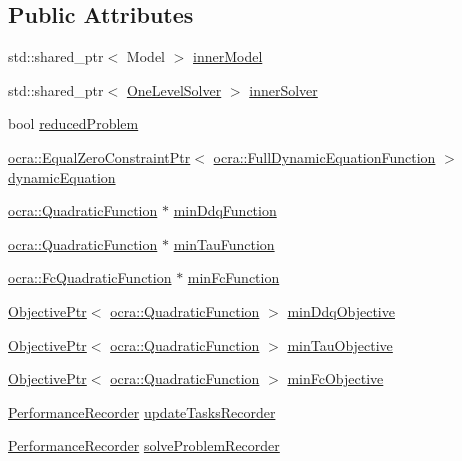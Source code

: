 \subsection*{Public Attributes}
\begin{DoxyCompactItemize}
\item 
std\+::shared\+\_\+ptr$<$ Model $>$ \hyperlink{structwocra_1_1WocraController_1_1Pimpl_a4fe5b4fd5e927bbf9c83bf10ffafc98f}{inner\+Model}
\item 
std\+::shared\+\_\+ptr$<$ \hyperlink{classocra_1_1OneLevelSolver}{One\+Level\+Solver} $>$ \hyperlink{structwocra_1_1WocraController_1_1Pimpl_a761307f74ee3b130993d589372164b98}{inner\+Solver}
\item 
bool \hyperlink{structwocra_1_1WocraController_1_1Pimpl_a809b85a6059fda8abddf709a92224443}{reduced\+Problem}
\item 
\hyperlink{classocra_1_1EqualZeroConstraintPtr}{ocra\+::\+Equal\+Zero\+Constraint\+Ptr}$<$ \hyperlink{classocra_1_1FullDynamicEquationFunction}{ocra\+::\+Full\+Dynamic\+Equation\+Function} $>$ \hyperlink{structwocra_1_1WocraController_1_1Pimpl_a1109652d5d4a11542cc5130713977b73}{dynamic\+Equation}
\item 
\hyperlink{classocra_1_1QuadraticFunction}{ocra\+::\+Quadratic\+Function} $\ast$ \hyperlink{structwocra_1_1WocraController_1_1Pimpl_aac1952b2ca7547f82d807089baa98f10}{min\+Ddq\+Function}
\item 
\hyperlink{classocra_1_1QuadraticFunction}{ocra\+::\+Quadratic\+Function} $\ast$ \hyperlink{structwocra_1_1WocraController_1_1Pimpl_a49e2adcc51cd75b3a17ebf31cf497d31}{min\+Tau\+Function}
\item 
\hyperlink{classocra_1_1FcQuadraticFunction}{ocra\+::\+Fc\+Quadratic\+Function} $\ast$ \hyperlink{structwocra_1_1WocraController_1_1Pimpl_af1d4d6700f771ae7c2bf129b7cb1fd06}{min\+Fc\+Function}
\item 
\hyperlink{classocra_1_1ObjectivePtr}{Objective\+Ptr}$<$ \hyperlink{classocra_1_1QuadraticFunction}{ocra\+::\+Quadratic\+Function} $>$ \hyperlink{structwocra_1_1WocraController_1_1Pimpl_a7fc80a10628bf0361a7c44d5bb659742}{min\+Ddq\+Objective}
\item 
\hyperlink{classocra_1_1ObjectivePtr}{Objective\+Ptr}$<$ \hyperlink{classocra_1_1QuadraticFunction}{ocra\+::\+Quadratic\+Function} $>$ \hyperlink{structwocra_1_1WocraController_1_1Pimpl_a02fbd15274314a18d7518ad0bb721358}{min\+Tau\+Objective}
\item 
\hyperlink{classocra_1_1ObjectivePtr}{Objective\+Ptr}$<$ \hyperlink{classocra_1_1QuadraticFunction}{ocra\+::\+Quadratic\+Function} $>$ \hyperlink{structwocra_1_1WocraController_1_1Pimpl_a204f0258bde95ab0f29d1d1937cd80d2}{min\+Fc\+Objective}
\item 
\hyperlink{classwocra_1_1PerformanceRecorder}{Performance\+Recorder} \hyperlink{structwocra_1_1WocraController_1_1Pimpl_a91e262e3ecf52354aefa49e76b9e0eb9}{update\+Tasks\+Recorder}
\item 
\hyperlink{classwocra_1_1PerformanceRecorder}{Performance\+Recorder} \hyperlink{structwocra_1_1WocraController_1_1Pimpl_a446e043430909aacb7955ff847c3a311}{solve\+Problem\+Recorder}
\end{DoxyCompactItemize}


